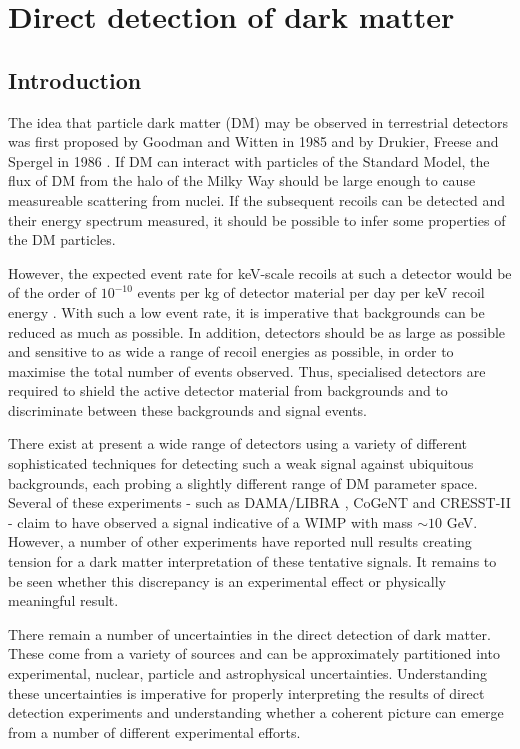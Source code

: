 \chapter{Direct detection of dark matter}

\section{Introduction}

The idea that particle dark matter (DM) may be observed in terrestrial detectors was first proposed by Goodman and Witten in 1985 \cite{Goodman:1985} and by Drukier, Freese and Spergel in 1986 \cite{Drukier:1986}. If DM can interact with particles of the Standard Model, the flux of DM from the halo of the Milky Way should be large enough to cause measureable scattering from nuclei. If the subsequent recoils can be detected and their energy spectrum measured, it should be possible to infer some properties of the DM particles.

However, the expected event rate for keV-scale recoils at such a detector would be of the order of $10^{-10}$ events per kg of detector material per day per keV recoil energy \cite{Cerdeno:2010}. With such a low event rate, it is imperative that backgrounds can be reduced as much as possible. In addition, detectors should be as large as possible and sensitive to as wide a range of recoil energies as possible, in order to maximise the total number of events observed. Thus, specialised detectors are required to shield the active detector material from backgrounds and to discriminate between these backgrounds and signal events.

There exist at present a wide range of detectors using a variety of different sophisticated techniques for detecting such a weak signal against ubiquitous backgrounds, each probing a slightly different range of DM parameter space. Several of these experiments - such as DAMA/LIBRA \cite{Bernabei:2010}, CoGeNT \cite{Aalseth:2011a, Aalseth:2011b} and CRESST-II \cite{Stodolsky:2012} - claim to have observed a signal indicative of a WIMP with mass $\sim 10$ GeV. However, a number of other experiments have reported null results creating tension for a dark matter interpretation of these tentative signals. It remains to be seen whether this discrepancy is an experimental effect or physically meaningful result. 

There remain a number of uncertainties in the direct detection of dark matter. These come from a variety of sources and can be approximately partitioned into experimental, nuclear, particle and astrophysical uncertainties. Understanding these uncertainties is imperative for properly interpreting the results of direct detection experiments and understanding whether a coherent picture can emerge from a number of different experimental efforts.

